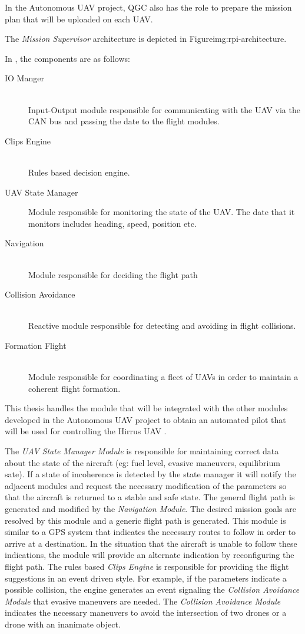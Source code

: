 In the Autonomous UAV project, QGC also has the role to prepare the mission plan
that will be uploaded on each UAV.

The \textit {Mission Supervisor} architecture is depicted in  
{Figure}{img:rpi-architecture}.

\newpage
In , the components are as
follows:
\begin{description}
\item [IO Manger] \hfill \\
Input-Output module responsible for communicating with the UAV via the CAN bus 
and passing the date to the flight modules.
\item [Clips Engine] \hfill \\
Rules based decision engine.
\item [UAV State Manager] Module responsible for monitoring the state of the UAV.
The date that it monitors includes heading, speed,  position etc.
\item [Navigation] \hfill \\
Module responsible for deciding the flight path
\item [Collision Avoidance] \hfill \\
Reactive module responsible for detecting and avoiding in flight collisions.
\item [Formation Flight] \hfill \\
Module responsible for coordinating a fleet of UAVs in order to maintain a coherent
flight formation.
\end{description}

This thesis handles the \project module that will be integrated with the other
modules developed in the Autonomous UAV project to obtain an automated pilot
that will be used for controlling the Hirrus UAV \cite{hirrus}.

The \textit{UAV State Manager Module} is responsible for maintaining correct
data about the state of the aircraft (eg: fuel level, evasive maneuvers, equilibrium
sate). If a state of incoherence is detected by the state manager it will notify
the adjacent modules and request the necessary modification of the parameters
so that the aircraft is returned to a stable and safe state. The general flight
path is generated and modified by the \textit{Navigation Module}. The desired
mission goals are resolved by this module and a generic flight path is generated.
This module is similar to a GPS system that indicates the necessary routes 
to follow in order to arrive at a destination. In the situation that the aircraft is 
unable to follow these indications, the module will provide
an alternate indication by reconfiguring the flight path. The 
rules based \textit{Clips Engine} is responsible for providing the flight 
suggestions in an event driven style. For example, if the parameters indicate
a possible collision, the engine generates an event signaling the \textit{
  Collision Avoidance Module} that evasive maneuvers are needed. The \textit{
Collision Avoidance Module} indicates the necessary maneuvers to avoid the
intersection of two drones or a drone with an inanimate object. 

